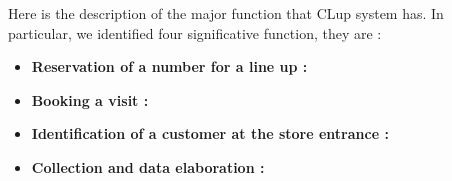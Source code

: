 Here is the description of the major function that CLup system has. In particular, we identified four significative function, they are :
\begin{itemize}
    \item \textbf{Reservation of a number for a line up :}
    \item \textbf{Booking a visit :}
    \item \textbf{Identification of a customer at the store entrance :}
    \item \textbf{Collection and data elaboration :}
\end{itemize}